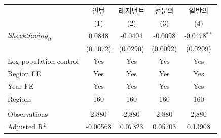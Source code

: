 \begingroup
\centering
\begin{tabular}{lcccc}
   \toprule
                          & 인턴     & 레지던트 & 전문의   & 일반의 \\   
                          & (1)      & (2)      & (3)      & (4)\\  
   \midrule 
   $ShockSaving_{it}$     & 0.0848   & -0.0404  & -0.0098  & -0.0478$^{**}$\\   
                          & (0.1072) & (0.0290) & (0.0092) & (0.0209)\\   
   Log population control & Yes      & Yes      & Yes      & Yes\\  
   Region FE              & Yes      & Yes      & Yes      & Yes\\  
   Year FE                & Yes      & Yes      & Yes      & Yes\\  
   Regions                & 160      & 160      & 160      & 160\\  
    \\
   Observations           & 2,880    & 2,880    & 2,880    & 2,880\\  
   Adjusted R$^2$         & -0.00568 & 0.07823  & 0.05703  & 0.13908\\  
   \bottomrule
\end{tabular}
\par\endgroup

